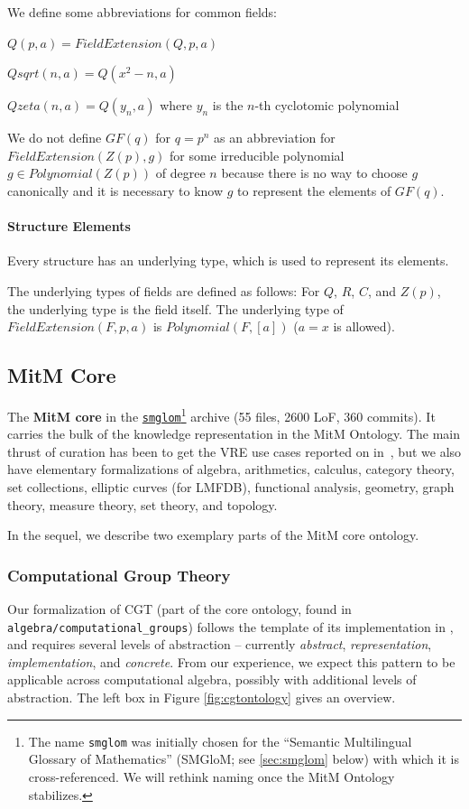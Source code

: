 We define some abbreviations for common fields:
\begin{compactitem}
 \item $Q(p,a)=FieldExtension(Q,p,a)$
 \item $Qsqrt(n,a)=Q(x^2-n,a)$
 \item $Qzeta(n,a)=Q(y_n,a)$ where $y_n$ is the $n$-th cyclotomic polynomial
\end{compactitem}

We do not define $GF(q)$ for $q=p^n$ as an abbreviation for $FieldExtension(Z(p),g)$ for some irreducible polynomial $g\in Polynomial(Z(p))$ of degree $n$ because there is no way to choose $g$ canonically and it is necessary to know $g$ to represent the elements of $GF(q)$.

\paragraph{Structure Elements}
Every structure has an underlying type, which is used to represent its elements.

The underlying types of fields are defined as follows:
For $Q$, $R$, $C$, and $Z(p)$, the underlying type is the field itself.
The underlying type of $FieldExtension(F,p,a)$ is $Polynomial(F,[a])$ ($a=x$ is allowed).

\subsection{MitM Core}

The \textbf{MitM core} in the
  \href{https://gl.mathhub.info/MitM/smglom}{\texttt{smglom}}\footnote{The name
    \texttt{smglom} was initially chosen for the ``Semantic Multilingual Glossary of
    Mathematics'' (SMGloM; see \ref{sec:smglom} below) with which it is
    cross-referenced. We will rethink naming once the MitM Ontology stabilizes.}  archive
  (55 files, 2600 LoF, 360 commits). It carries the bulk of the knowledge representation in
  the MitM Ontology. The main thrust of curation has been to get the VRE use cases
  reported on in~\cite{ODK-D6.5}, but we also have elementary formalizations of algebra,
  arithmetics, calculus, category theory, set collections, elliptic curves (for LMFDB),
  functional analysis, geometry, graph theory, measure theory, set theory, and topology.


In the sequel, we describe two exemplary parts of the MitM core ontology.

\subsubsection{Computational Group Theory}
Our formalization of CGT (part of the core ontology, found in \texttt{algebra/computational\_groups}) follows the template of its implementation in \GAP, and requires several levels of abstraction -- currently \emph{abstract}, \emph{representation}, \emph{implementation}, and \emph{concrete}. From our experience, we expect this pattern to be applicable across computational algebra, possibly with additional levels of abstraction. 
The left box in Figure \ref{fig:cgtontology} gives an overview.

